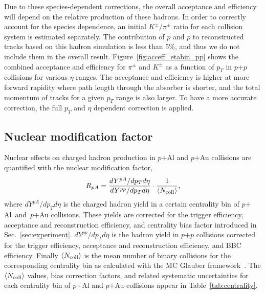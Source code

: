 \documentclass[twocolumn,letterpaper,aps,prc,longbibliography,superscriptaddress,nofootinbib,floatfix]{revtex4-2}
\newcommand{\pt}{\mbox{$p_T$}\xspace}
\newcommand{\ncoll}{\mbox{$\langle N_{\rm coll} \rangle$}\xspace}
\newcommand{\pp}{\mbox{$p$+$p$}\xspace}
\newcommand{\pau}{\mbox{$p$$+$Au}\xspace}
\newcommand{\pal}{\mbox{$p$$+$Al}\xspace}
\newcommand{\palau}{\mbox{$p$$+$Al and $p$$+$Au}\xspace}
\begin{document}
Due to these species-dependent corrections, the overall acceptance and 
efficiency will depend on the relative production of these hadrons. In 
order to correctly account for the species dependence, an initial 
$K^{\pm}/\pi^{\pm}$ ratio for each collision system is estimated 
separately. The contribution of $p$ and $\bar{p}$ to reconstructed 
tracks based on this hadron simulation is less than 5\%, and thus we do 
not include them in the overall result. 
Figure~\ref{fig:acceff_etabin_pp} shows the combined acceptance and 
efficiency for $\pi^{\pm}$ and $K^{\pm}$ as a function of \pt in \pp 
collisions for various $\eta$ ranges. The acceptance and efficiency is 
higher at more forward rapidity where path length through the absorber 
is shorter, and the total momentum of tracks for a given \pt range is 
also larger.  To have a more accurate correction, the full \pt 
and $\eta$ dependent correction is applied.

\subsection{Nuclear modification factor}

Nuclear effects on charged hadron production in \pal and \pau collisions 
are quantified with the nuclear modification factor,
\begin{equation}
R_{pA} = \frac{dY^{pA}/dp_{T}d\eta}{dY^{pp}/dp_{T}d\eta} \cdot \frac{1}{\ncoll},
\end{equation}
where $dY^{pA}/dp_{T}d\eta$ is the charged hadron yield in a certain 
centrality bin of \palau collisions.  These yields are corrected for the 
trigger efficiency, acceptance and reconstruction efficiency, and 
centrality bias factor introduced in Sec.~\ref{sec:experiment}. 
$dY^{pp}/dp_{T}d\eta$ is the hadron yield in \pp collisions corrected 
for the trigger efficiency, acceptance and reconstruction efficiency, 
and BBC efficiency. Finally \ncoll is the mean number of binary 
collisions for the corresponding centrality bin as calculated with the 
MC Glauber framework~\cite{Loizides:2014vua}. The \ncoll values, bias 
correction factors, and related systematic uncertainties for each 
centrality bin of \pal and \pau collisions appear in 
Table~\ref{tab:centrality}.
\end{document}

